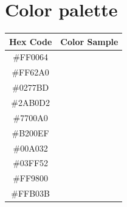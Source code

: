 \section{Color palette}
\begin{table}[h]
    \centering
    \renewcommand{\arraystretch}{1.5} %
    \setlength{\tabcolsep}{12pt} %
    \begin{tabular}{c c}
        \toprule
        \textbf{Hex Code} & \textbf{Color Sample} \\
        \midrule


        \#FF0064 & \cellcolor[HTML]{FF0064} \hspace{2cm} \\
        \#FF62A0 & \cellcolor[HTML]{FF62A0} \hspace{2cm} \\
        \#0277BD & \cellcolor[HTML]{0277BD} \hspace{2cm} \\
        \#2AB0D2 & \cellcolor[HTML]{2AB0D2} \hspace{2cm} \\
        \#7700A0 & \cellcolor[HTML]{7700A0} \hspace{2cm} \\
        \#B200EF & \cellcolor[HTML]{B200EF} \hspace{2cm} \\
        \#00A032 & \cellcolor[HTML]{00A032} \hspace{2cm} \\
        \#03FF52 & \cellcolor[HTML]{03FF52} \hspace{2cm} \\
        \#FF9800 & \cellcolor[HTML]{FF9800} \hspace{2cm} \\
        \#FFB03B & \cellcolor[HTML]{FFB03B} \hspace{2cm} \\


\end{tabular}
\end{table}
